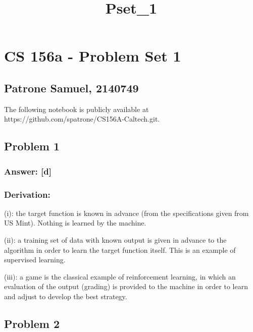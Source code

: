 \documentclass[11pt]{article}
\title{Pset\_1}
\begin{document}
    
    \maketitle
    
    

    
    \hypertarget{cs-156a---problem-set-1}{%
\section{CS 156a - Problem Set 1}\label{cs-156a---problem-set-1}}

\hypertarget{patrone-samuel-2140749}{%
\subsection{Patrone Samuel, 2140749}\label{patrone-samuel-2140749}}

The following notebook is publicly available at
https://github.com/spatrone/CS156A-Caltech.git.

    \hypertarget{problem-1}{%
\subsection{Problem 1}\label{problem-1}}

\hypertarget{answer-d}{%
\subsubsection{Answer: {[}d{]}}\label{answer-d}}

\hypertarget{derivation}{%
\subsubsection{Derivation:}\label{derivation}}

(i): the target function is known in advance (from the specifications
given from US Mint). Nothing is learned by the machine.

(ii): a training set of data with known output is given in advance to
the algorithm in order to learn the target function itself. This is an
example of supervised learning.

(iii): a game is the classical example of reinforcement learning, in
which an evaluation of the output (grading) is provided to the machine
in order to learn and adjust to develop the best strategy.

    \hypertarget{problem-2}{%
\subsection{Problem 2}\label{problem-2}}
\end{document}
